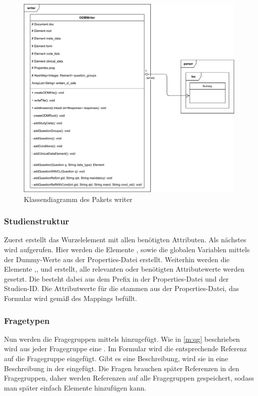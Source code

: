 \begin{figure}[h]
			\centering
			\includegraphics[width=.98\textwidth]{./img/cls_writer.png}
			\caption{Klassendiagramm des Pakets writer}
\end{figure}

\subsubsection{Studienstruktur}

Zuerst erstellt  das Wurzelelement  mit allen benötigten Attributen.
Als nächstes wird  aufgerufen. Hier werden die Elemente , sowie die globalen Variablen mittels der Dummy-Werte aus der Properties-Datei erstellt.
Weiterhin werden die Elemente ,,  und  erstellt, alle relevanten oder benötigten Attributewerte werden gesetzt.
Die  besteht dabei aus dem Prefix in der Properties-Datei und der Studien-ID.
Die Attributwerte für die  stammen aus der Properties-Datei, das Formular wird gemäß des Mappings befüllt.

\subsubsection{Fragetypen}

Nun werden die Fragegruppen mittels  hinzugefügt. Wie in \cref{m:qg} beschrieben wird aus jeder Fragegruppe eine .
Im Formular wird die entsprechende Referenz auf die Fragegruppe eingefügt.
Gibt es eine Beschreibung, wird sie in eine Beschreibung in der  eingefügt.
Die Fragen brauchen später Referenzen in den Fragegruppen, daher werden Referenzen auf alle Fragegruppen gespeichert, sodass man später einfach Elemente hinzufügen kann.

